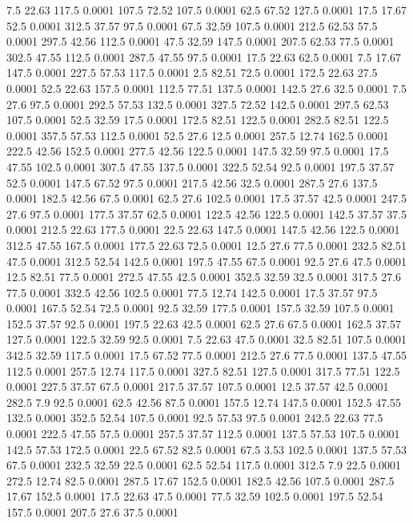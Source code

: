 7.5	22.63	117.5	0.0001
107.5	72.52	107.5	0.0001
62.5	67.52	127.5	0.0001
17.5	17.67	52.5	0.0001
312.5	37.57	97.5	0.0001
67.5	32.59	107.5	0.0001
212.5	62.53	57.5	0.0001
297.5	42.56	112.5	0.0001
47.5	32.59	147.5	0.0001
207.5	62.53	77.5	0.0001
302.5	47.55	112.5	0.0001
287.5	47.55	97.5	0.0001
17.5	22.63	62.5	0.0001
7.5	17.67	147.5	0.0001
227.5	57.53	117.5	0.0001
2.5	82.51	72.5	0.0001
172.5	22.63	27.5	0.0001
52.5	22.63	157.5	0.0001
112.5	77.51	137.5	0.0001
142.5	27.6	32.5	0.0001
7.5	27.6	97.5	0.0001
292.5	57.53	132.5	0.0001
327.5	72.52	142.5	0.0001
297.5	62.53	107.5	0.0001
52.5	32.59	17.5	0.0001
172.5	82.51	122.5	0.0001
282.5	82.51	122.5	0.0001
357.5	57.53	112.5	0.0001
52.5	27.6	12.5	0.0001
257.5	12.74	162.5	0.0001
222.5	42.56	152.5	0.0001
277.5	42.56	122.5	0.0001
147.5	32.59	97.5	0.0001
17.5	47.55	102.5	0.0001
307.5	47.55	137.5	0.0001
322.5	52.54	92.5	0.0001
197.5	37.57	52.5	0.0001
147.5	67.52	97.5	0.0001
217.5	42.56	32.5	0.0001
287.5	27.6	137.5	0.0001
182.5	42.56	67.5	0.0001
62.5	27.6	102.5	0.0001
17.5	37.57	42.5	0.0001
247.5	27.6	97.5	0.0001
177.5	37.57	62.5	0.0001
122.5	42.56	122.5	0.0001
142.5	37.57	37.5	0.0001
212.5	22.63	177.5	0.0001
22.5	22.63	147.5	0.0001
147.5	42.56	122.5	0.0001
312.5	47.55	167.5	0.0001
177.5	22.63	72.5	0.0001
12.5	27.6	77.5	0.0001
232.5	82.51	47.5	0.0001
312.5	52.54	142.5	0.0001
197.5	47.55	67.5	0.0001
92.5	27.6	47.5	0.0001
12.5	82.51	77.5	0.0001
272.5	47.55	42.5	0.0001
352.5	32.59	32.5	0.0001
317.5	27.6	77.5	0.0001
332.5	42.56	102.5	0.0001
77.5	12.74	142.5	0.0001
17.5	37.57	97.5	0.0001
167.5	52.54	72.5	0.0001
92.5	32.59	177.5	0.0001
157.5	32.59	107.5	0.0001
152.5	37.57	92.5	0.0001
197.5	22.63	42.5	0.0001
62.5	27.6	67.5	0.0001
162.5	37.57	127.5	0.0001
122.5	32.59	92.5	0.0001
7.5	22.63	47.5	0.0001
32.5	82.51	107.5	0.0001
342.5	32.59	117.5	0.0001
17.5	67.52	77.5	0.0001
212.5	27.6	77.5	0.0001
137.5	47.55	112.5	0.0001
257.5	12.74	117.5	0.0001
327.5	82.51	127.5	0.0001
317.5	77.51	122.5	0.0001
227.5	37.57	67.5	0.0001
217.5	37.57	107.5	0.0001
12.5	37.57	42.5	0.0001
282.5	7.9	92.5	0.0001
62.5	42.56	87.5	0.0001
157.5	12.74	147.5	0.0001
152.5	47.55	132.5	0.0001
352.5	52.54	107.5	0.0001
92.5	57.53	97.5	0.0001
242.5	22.63	77.5	0.0001
222.5	47.55	57.5	0.0001
257.5	37.57	112.5	0.0001
137.5	57.53	107.5	0.0001
142.5	57.53	172.5	0.0001
22.5	67.52	82.5	0.0001
67.5	3.53	102.5	0.0001
137.5	57.53	67.5	0.0001
232.5	32.59	22.5	0.0001
62.5	52.54	117.5	0.0001
312.5	7.9	22.5	0.0001
272.5	12.74	82.5	0.0001
287.5	17.67	152.5	0.0001
182.5	42.56	107.5	0.0001
287.5	17.67	152.5	0.0001
17.5	22.63	47.5	0.0001
77.5	32.59	102.5	0.0001
197.5	52.54	157.5	0.0001
207.5	27.6	37.5	0.0001
